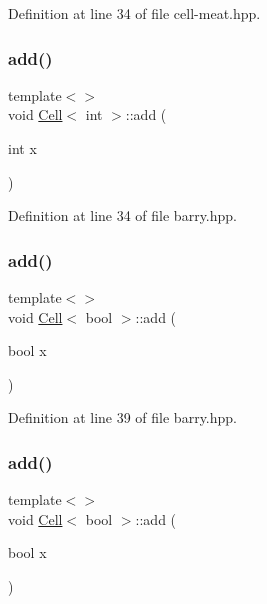 Definition at line 34 of file cell-\/meat.\+hpp.

\mbox{\label{class_cell_a74cb069c7341de33354c396465818c2f}} 
\subsubsection{\texorpdfstring{add()}{add()}\hspace{0.1cm}{\footnotesize\ttfamily [6/9]}}
{\footnotesize\ttfamily template$<$$>$ \\
void \hyperlink{class_cell}{Cell}$<$ int $>$\+::add (\begin{DoxyParamCaption}\item[{int}]{x }\end{DoxyParamCaption})\hspace{0.3cm}{\ttfamily [inline]}}



Definition at line 34 of file barry.\+hpp.

\mbox{\label{class_cell_a0da6d3d39069cc22486442cc51c7685c}} 
\subsubsection{\texorpdfstring{add()}{add()}\hspace{0.1cm}{\footnotesize\ttfamily [7/9]}}
{\footnotesize\ttfamily template$<$$>$ \\
void \hyperlink{class_cell}{Cell}$<$ bool $>$\+::add (\begin{DoxyParamCaption}\item[{bool}]{x }\end{DoxyParamCaption})\hspace{0.3cm}{\ttfamily [inline]}}



Definition at line 39 of file barry.\+hpp.

\mbox{\label{class_cell_a0da6d3d39069cc22486442cc51c7685c}} 
\subsubsection{\texorpdfstring{add()}{add()}\hspace{0.1cm}{\footnotesize\ttfamily [8/9]}}
{\footnotesize\ttfamily template$<$$>$ \\
void \hyperlink{class_cell}{Cell}$<$ bool $>$\+::add (\begin{DoxyParamCaption}\item[{bool}]{x }\end{DoxyParamCaption})\hspace{0.3cm}{\ttfamily [inline]}}



